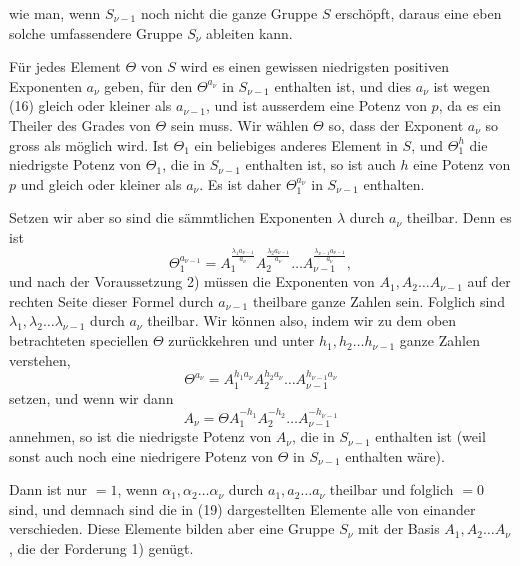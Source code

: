wie man, wenn $S_{\nu-1}$ noch nicht die ganze Gruppe $S$ erschöpft, daraus eine eben solche umfassendere Gruppe $S_\nu$ ableiten kann.

Für jedes Element $\Theta$ von $S$ wird es einen gewissen niedrigsten positiven Exponenten $a_\nu$ geben, für den $\Theta^{a_\nu}$ in $S_{\nu-1}$ enthalten ist, und dies $a_\nu$ ist wegen (16) gleich oder kleiner als $a_{\nu-1}$, und ist ausserdem eine Potenz von $p$, da es ein Theiler des Grades von $\Theta$ sein muss. Wir wählen $\Theta$ so, dass der Exponent $a_\nu$ so gross als möglich wird. Ist $\Theta_1$ ein beliebiges anderes Element in $S$, und $\Theta_1^h$ die niedrigste Potenz von $\Theta_1$, die in $S_{\nu-1}$ enthalten ist, so ist auch $h$ eine Potenz von $p$ und gleich oder kleiner als $a_\nu$. Es ist daher $\Theta_1^{a_\nu}$ in $S_{\nu-1}$ enthalten.

Setzen wir aber
so sind die sämmtlichen Exponenten $\lambda$ durch $a_\nu$ theilbar. Denn es ist
\[
\Theta_1^{a_{\nu-1}} = A_1^{\frac{\lambda_1 a_{\nu-1}}{a_\nu}} A_2^{\frac{\lambda_2 a_{\nu-1}}{a_\nu}} \ldots A_{\nu-1}^{\frac{\lambda_{\nu-1} a_{\nu-1}}{a_\nu}},
\]
und nach der Voraussetzung 2) müssen die Exponenten von $A_1, A_2 \ldots A_{\nu-1}$ auf der rechten Seite dieser Formel durch $a_{\nu-1}$ theilbare ganze Zahlen sein. Folglich sind $\lambda_1, \lambda_2 \ldots \lambda_{\nu-1}$ durch $a_\nu$ theilbar. Wir können also, indem wir zu dem oben betrachteten speciellen $\Theta$ zurückkehren und unter $h_1, h_2 \ldots h_{\nu-1}$ ganze Zahlen verstehen,
\[
\Theta^{a_\nu} = A_1^{h_1 a_\nu} A_2^{h_2 a_\nu} \ldots A_{\nu-1}^{h_{\nu-1} a_\nu}
\]
setzen, und wenn wir dann
\[
A_\nu = \Theta A_1^{-h_1} A_2^{-h_2} \ldots A_{\nu-1}^{-h_{\nu-1}}
\]
annehmen, so ist
die niedrigste Potenz von $A_\nu$, die in $S_{\nu-1}$ enthalten ist (weil sonst auch noch eine niedrigere Potenz von $\Theta$ in $S_{\nu-1}$ enthalten wäre).

Dann ist
nur $= 1$, wenn $\alpha_1, \alpha_2 \ldots \alpha_\nu$ durch $a_1, a_2 \ldots a_\nu$ theilbar und folglich $= 0$ sind, und demnach sind die in (19) dargestellten Elemente alle von einander verschieden. Diese Elemente bilden aber eine Gruppe $S_\nu$ mit der Basis $A_1, A_2 \ldots A_\nu$, die der Forderung 1) genügt.
